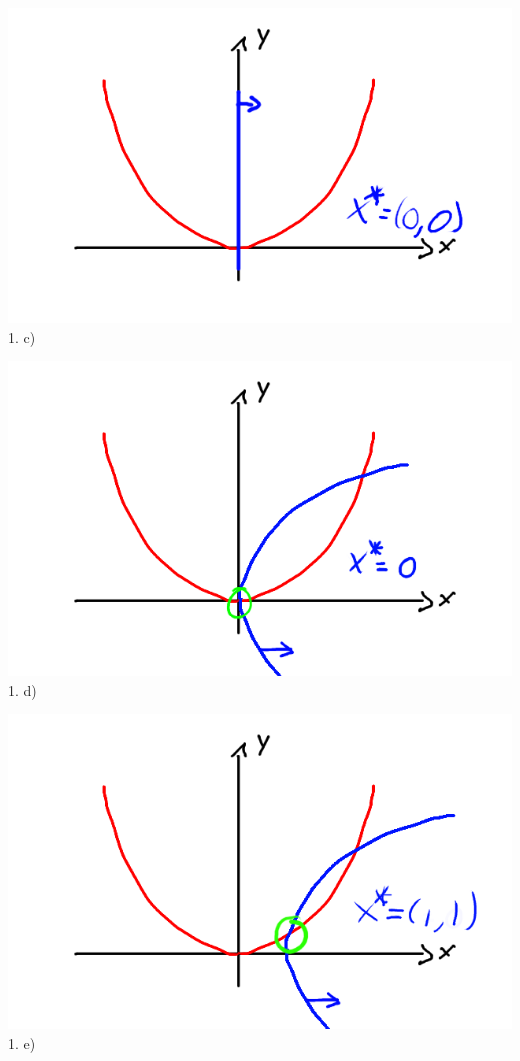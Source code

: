 \begin{minipage}{0.45\textwidth}
\includegraphics[width=\textwidth]{fig/model/1c.png}
1. c)
\end{minipage}
\hfill
\begin{minipage}{0.45\textwidth}
\includegraphics[width=\textwidth]{fig/model/1d.png}
1. d)
\end{minipage}

\begin{minipage}{0.45\textwidth}
\includegraphics[width=\textwidth]{fig/model/1e.png}
1. e)
\end{minipage}


